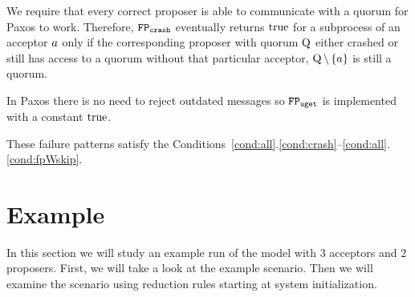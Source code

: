 We require that every correct proposer is able to communicate with a quorum for Paxos to work.
Therefore, $\mathtt{FP_{crash}}$ eventually returns $\operatorname{true}$ for a subprocess of an acceptor $a$ only if the corresponding proposer with quorum $\operatorname{Q}$ either crashed or still has access to a quorum without that particular acceptor, \ie $\operatorname{Q}\setminus\left\{a\right\}$ is still a quorum.

In Paxos there is no need to reject outdated messages so $\mathtt{FP_{uget}}$ is implemented with a constant $\operatorname{true}$.

These failure patterns satisfy the Conditions~\ref{cond:all}.\ref{cond:crash}--\ref{cond:all}.\ref{cond:fpWskip}.

\section{Example}
In this section we will study an example run of the model with $3$ acceptors and $2$ proposers.
First, we will take a look at the example scenario.
Then we will examine the scenario using reduction rules starting at system initialization.

